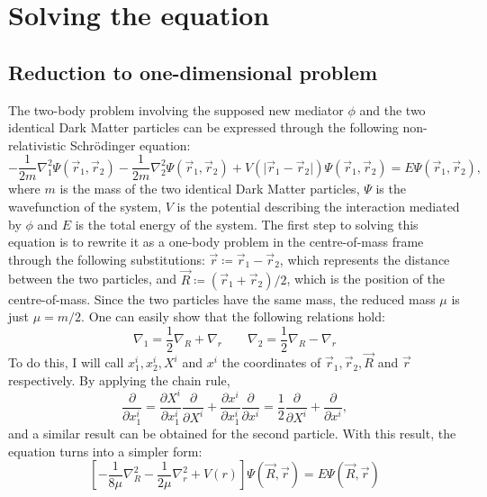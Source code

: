 \chapter{Solving the equation}

\section{Reduction to one-dimensional problem}

The two-body problem involving the supposed new mediator \(\phi \) and the two identical Dark Matter particles can be expressed through the following non-relativistic Schrödinger equation:
\begin{equation}
	-\frac{1}{2m} \nabla_1 ^2 \Psi(\vec{r}_1,\vec{r}_2)  - \frac{1}{2m} \nabla_2 ^2 \Psi(\vec{r}_1,\vec{r}_2)  + V(\vert \vec{r}_1 - \vec{r}_2 \vert ) \Psi(\vec{r}_1,\vec{r}_2) =E \Psi (\vec{r}_1,\vec{r}_2),
\end{equation}
where \(m\) is the mass of the two identical Dark Matter particles, \(\Psi\) is the wavefunction of the system, \(V\) is the potential describing the interaction mediated by \(\phi \) and \(E\) is the total energy of the system. The first step to solving this equation is to rewrite it as a one-body problem in the centre-of-mass frame through the following substitutions: \(\vec{r} \coloneqq  \vec{r}_1 - \vec{r}_2\), which represents the distance between the two particles, and \(\vec{R} \coloneqq (\vec{r}_1 + \vec{r}_2) / 2\), which is the position of the centre-of-mass. Since the two particles have the same mass, the reduced mass \(\mu \) is just \(\mu = m / 2\). One can easily show that the following relations hold:
\begin{equation}
	\nabla _1 = \frac{1}{2} \nabla _R + \nabla _r
	\qquad
	\nabla _2 = \frac{1}{2} \nabla _R - \nabla _r
\end{equation}
To do this, I will call \(x^i_1, x^i_2, X^i \) and \(x^i\) the coordinates of \(\vec{r}_1, \vec{r}_2, \vec{R} \) and \(\vec{r}\) respectively. By applying the chain rule,
\begin{equation}
	\frac{\partial }{\partial x^i_1} = \frac{\partial X^i}{\partial x^i_1} \frac{\partial }{\partial X^i} + \frac{\partial x^i}{\partial x^i_1} \frac{\partial }{\partial x^i} = \frac{1}{2} \frac{\partial }{\partial X^i} + \frac{\partial }{\partial x^i},
\end{equation}
and a similar result can be obtained for the second particle. With this result, the equation turns into a simpler form:
\begin{equation}
	\left[- \frac{1}{8\mu} \nabla _R^{2} - \frac{1}{2\mu } \nabla _r^2 + V(r)\right] \Psi (\vec{R},\vec{r})= E \Psi (\vec{R},\vec{r})
\end{equation}
